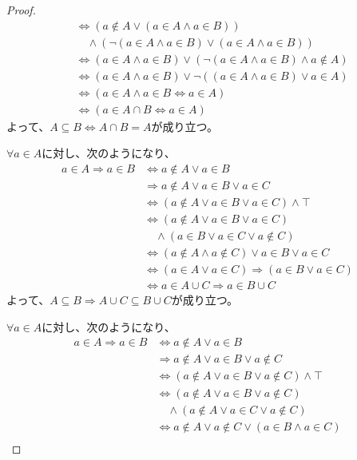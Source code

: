 \documentclass[a4paper]{jsarticle}
\begin{document}
\begin{proof}
\begin{align*}
&\Leftrightarrow \left( a \notin A \vee (a \in A \land a \in B) \right) \\
&\quad \land \left( \neg(a \in A \land a \in B) \vee (a \in A \land a \in B) \right)\\
&\Leftrightarrow (a \in A \land a \in B) \vee \left( \neg(a \in A \land a \in B) \land a \notin A \right)\\
&\Leftrightarrow (a \in A \land a \in B) \vee \neg\left( (a \in A \land a \in B) \vee a \in A \right)\\
&\Leftrightarrow (a \in A \land a \in B \Leftrightarrow a \in A)\\
&\Leftrightarrow (a \in A \cap B \Leftrightarrow a \in A)
\end{align*}
よって、$A \subseteq B \Leftrightarrow A \cap B = A$が成り立つ。\par
$\forall a \in A$に対し、次のようになり、
\begin{align*}
a \in A \Rightarrow a \in B &\Leftrightarrow a \notin A \vee a \in B\\
&\Rightarrow a \notin A \vee a \in B \vee a \in C\\
&\Leftrightarrow (a \notin A \vee a \in B \vee a \in C) \land \top\\
&\Leftrightarrow (a \notin A \vee a \in B \vee a \in C) \\
&\quad \land (a \in B \vee a \in C \vee a \notin C)\\
&\Leftrightarrow (a \notin A \land a \notin C) \vee a \in B \vee a \in C\\
&\Leftrightarrow (a \in A \vee a \in C) \Rightarrow (a \in B \vee a \in C)\\
&\Leftrightarrow a \in A \cup C \Rightarrow a \in B \cup C
\end{align*}
よって、$A \subseteq B \Rightarrow A \cup C \subseteq B \cup C$が成り立つ。\par
$\forall a \in A$に対し、次のようになり、
\begin{align*}
a \in A \Rightarrow a \in B &\Leftrightarrow a \notin A \vee a \in B\\
&\Rightarrow a \notin A \vee a \in B \vee a \notin C\\
&\Leftrightarrow (a \notin A \vee a \in B \vee a \notin C) \land \top\\
&\Leftrightarrow (a \notin A \vee a \in B \vee a \notin C) \\
&\quad \land (a \notin A \vee a \in C \vee a \notin C)\\
&\Leftrightarrow a \notin A \vee a \notin C \vee (a \in B \land a \in C)\\

\end{align*}
\end{proof}
\end{document}
